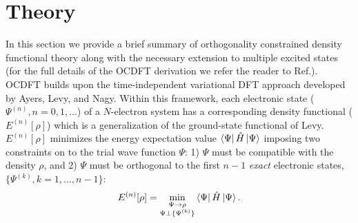 \documentclass{article}
\begin{document}
\section{Theory}
In this section we provide a brief summary of orthogonality constrained density functional theory along with the necessary extension to multiple excited states (for the full details of the OCDFT derivation we refer the reader to Ref.).
OCDFT builds upon the time-independent variational DFT approach developed by Ayers, Levy, and Nagy.\cite{ayers_time-independent_2012}
Within this framework, each electronic state ($\Psi^{(n)}, n=0,1,\ldots$) of a $N$-electron system has a corresponding density functional ($E^{(n)}[\rho]$) which is a generalization of the ground-state functional of Levy.   $E^{(n)}[\rho]$ minimizes the energy expectation value $\bra{\Psi}\hat{H}\ket{\Psi}$ imposing two constraints on to the trial wave function $\Psi$: 1) $\Psi$ must be compatible with the density $\rho$, and 2) $\Psi$ must be orthogonal to the first $n-1$ \textit{exact} electronic states, $\{\Psi^{(k)}, k = 1,\ldots,n-1\}$:
\begin{equation}
E^{(n)}[\rho] = \min_{
\substack{
\Psi \rightarrow \rho\\
\Psi\bot \{\Psi^{(k)}\}
}
}
\bra{\Psi}\hat{H}\ket{\Psi}.
\end{equation}
\end{document}
